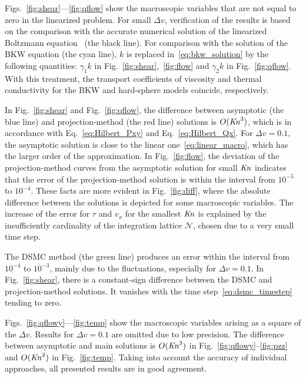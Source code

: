 \documentclass[]{jfm}
\newcommand{\Kn}{\mbox{\textit{Kn}}}
\newcommand{\OO}[1]{O(#1)}
\begin{document}
Figs.~\ref{fig:shear}---\ref{fig:qflow} show the macroscopic variables
that are not equal to zero in the linearized problem.
For small \(\Delta{v}\), verification of the results is based on the comparison with the accurate numerical solution
of the linearized Boltzmann equation~\citep{Ohwada1990} (the black line).
For comparison with the solution of the BKW equation (the cyan line),
\(k\) is replaced in~\eqref{eq:bkw_solution} by the following quantities:
\(\gamma_1k\) in Fig.~\ref{fig:shear},~\ref{fig:flow} and \(\gamma_2k\) in Fig.~\ref{fig:qflow}.
With this treatment, the transport coefficients of viscosity and thermal conductivity
for the BKW and hard-sphere models coincide, respectively.

In Fig.~\ref{fig:shear} and Fig.~\ref{fig:qflow}, the difference between asymptotic (the blue line)
and projection-method (the red line) solutions is \(\OO{\Kn^3}\),
which is in accordance with Eq.~\eqref{eq:Hilbert_Pxy} and Eq.~\eqref{eq:Hilbert_Qx}.
For \(\Delta{v}=0.1\), the asymptotic solution is close to the linear one~\eqref{eq:linear_macro},
which has the larger order of the approximation.
In Fig.~\ref{fig:flow}, the deviation of the projection-method curves
from the asymptotic solution for small \(\Kn\) indicates that
the error of the projection-method solution is within the interval from \(10^{-5}\) to \(10^{-4}\).
These facts are more evident in Fig.~\ref{fig:diff},
where the absolute difference between the solutions
is depicted for some macroscopic variables.
The increase of the error for \(\tau\) and \(v_x\) for the smallest \(\Kn\)
is explained by the insufficiently cardinality of the integration lattice \(\mathcal{N}\),
chosen due to a very small time step.

The DSMC method (the green line) produces an error within the interval from \(10^{-4}\) to \(10^{-3}\),
mainly due to the fluctuations, especially for \(\Delta{v}=0.1\).
In Fig.~\ref{fig:shear}, there is a constant-sign difference
between the DSMC and projection-method solutions.
It vanishes with the time step~\eqref{eq:dsmc_timestep} tending to zero.

Figs.~\ref{fig:qflowy}---\ref{fig:temp} show the macroscopic variables
arising as a square of the \(\Delta{v}\).
Results for \(\Delta{v}=0.1\) are omitted due to low precision.
The difference between asymptotic and main solutions
is \(\OO{\Kn^3}\) in Fig.~\ref{fig:qflowy}--\ref{fig:pzz} and \(\OO{\Kn^2}\) in Fig.~\ref{fig:temp}.
Taking into account the accuracy of individual approaches,
all presented results are in good agreement.
\end{document}
